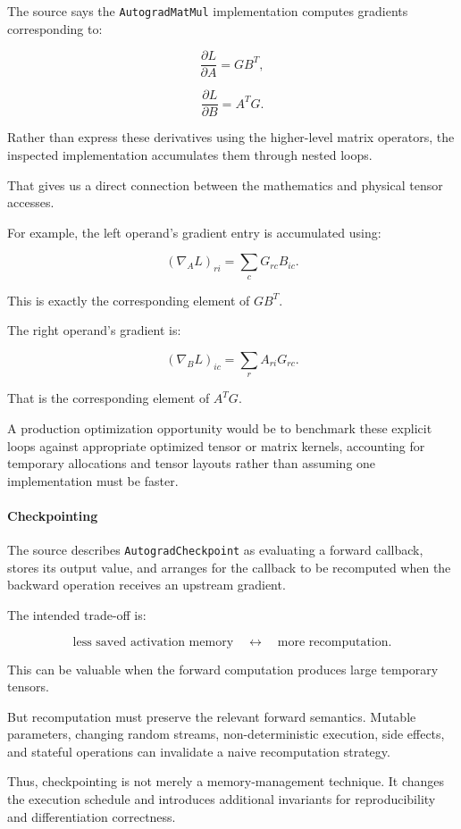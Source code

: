 The source says the \texttt{AutogradMatMul} implementation computes gradients corresponding to:

\[
\frac{\partial L}{\partial A}=GB^T,
\]

\[
\frac{\partial L}{\partial B}=A^TG.
\]

Rather than express these derivatives using the higher-level matrix operators, the inspected implementation accumulates them through nested loops.

That gives us a direct connection between the mathematics and physical tensor accesses.

For example, the left operand's gradient entry is accumulated using:

\[
(\nabla_A L)_{ri} = \sum_cG_{rc}B_{ic}.
\]

This is exactly the corresponding element of \(GB^T\).

The right operand's gradient is:

\[
(\nabla_B L)_{ic} = \sum_rA_{ri}G_{rc}.
\]

That is the corresponding element of \(A^TG\).

A production optimization opportunity would be to benchmark these explicit loops against appropriate optimized tensor or matrix kernels, accounting for temporary allocations and tensor layouts rather than assuming one implementation must be faster.

\paragraph{Checkpointing}\label{02-foundations-ii-ch022-checkpointing}

The source describes \texttt{AutogradCheckpoint} as evaluating a forward callback, stores its output value, and arranges for the callback to be recomputed when the backward operation receives an upstream gradient.

The intended trade-off is:

\[
\text{less saved activation memory} \quad\longleftrightarrow\quad \text{more recomputation}.
\]

This can be valuable when the forward computation produces large temporary tensors.

But recomputation must preserve the relevant forward semantics. Mutable parameters, changing random streams, non-deterministic execution, side effects, and stateful operations can invalidate a naive recomputation strategy.

Thus, checkpointing is not merely a memory-management technique. It changes the execution schedule and introduces additional invariants for reproducibility and differentiation correctness.

